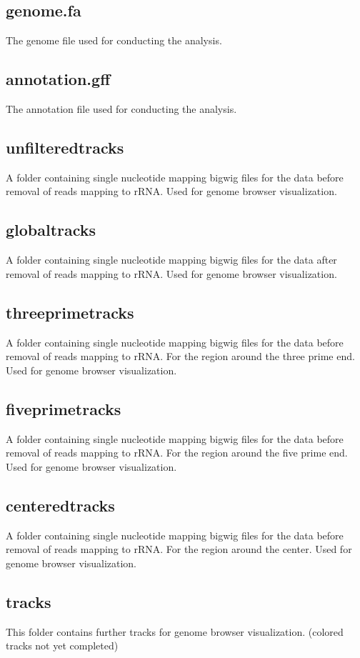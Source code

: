\documentclass[10pt,a4paper]{article}
\begin{document}
\subsection*{genome.fa}
The genome file used for conducting the analysis.
\subsection*{annotation.gff}
The annotation file used for conducting the analysis.

\subsection*{unfilteredtracks}
A folder containing single nucleotide mapping bigwig files for the data before removal of reads mapping to rRNA. Used for genome browser visualization.
\subsection*{globaltracks}
A folder containing single nucleotide mapping bigwig files for the data after removal of reads mapping to rRNA. Used for genome browser visualization.
\subsection*{threeprimetracks}
A folder containing single nucleotide mapping bigwig files for the data before removal of reads mapping to rRNA. For the region around the three prime end. Used for genome browser visualization.
\subsection*{fiveprimetracks}
A folder containing single nucleotide mapping bigwig files for the data before removal of reads mapping to rRNA. For the region around the five prime end. Used for genome browser visualization.
\subsection*{centeredtracks}
A folder containing single nucleotide mapping bigwig files for the data before removal of reads mapping to rRNA. For the region around the center. Used for genome browser visualization.
\subsection*{tracks}
This folder contains further tracks for genome browser visualization. (colored tracks not yet completed)
\end{document}
